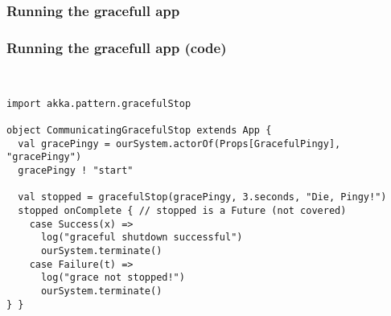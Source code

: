 \documentclass[aspectratio=169]{beamer}
\begin{document}
\begin{frame}[fragile]\frametitle{Running the gracefull app}
\centering
{}

\end{frame}

\begin{frame}[fragile]\frametitle{Running the gracefull app (code)}
~\\[-6mm]
\begin{lstlisting}[emph={Actor, Logging, Props, ourSystem,terminate,sleep,actorOf,receive,become,stop,onComplete,gracefulStop}]
import akka.pattern.gracefulStop

object CommunicatingGracefulStop extends App {
  val gracePingy = ourSystem.actorOf(Props[GracefulPingy], "gracePingy")
  gracePingy ! "start"

  val stopped = gracefulStop(gracePingy, 3.seconds, "Die, Pingy!")
  stopped onComplete { // stopped is a Future (not covered)
    case Success(x) =>
      log("graceful shutdown successful")
      ourSystem.terminate()
    case Failure(t) =>
      log("grace not stopped!")
      ourSystem.terminate()
} }
\end{lstlisting}
\end{frame}
\end{document}
